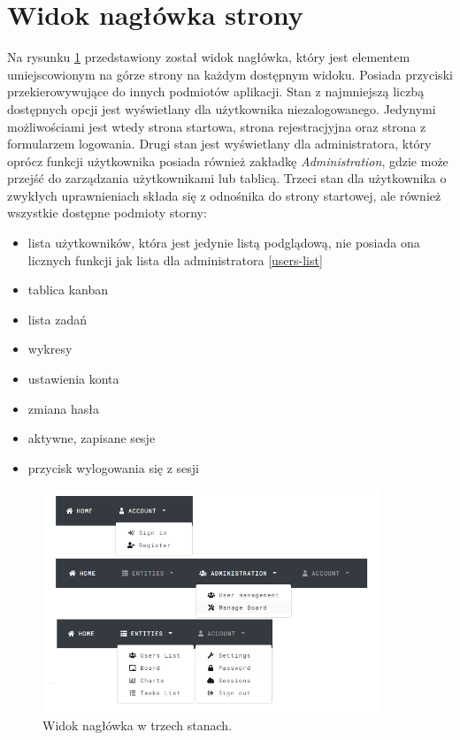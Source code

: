 \section{Widok nagłówka strony}
Na rysunku \ref{navbar-states} przedstawiony został widok nagłówka, który jest elementem umiejscowionym na górze strony na każdym dostępnym widoku. Posiada przyciski przekierowywujące do innych podmiotów aplikacji.
Stan z najmniejszą liczbą dostępnych opcji jest wyświetlany dla użytkownika niezalogowanego. Jedynymi możliwościami jest wtedy strona startowa, strona rejestracjyjna oraz strona z formularzem logowania.
Drugi stan jest wyświetlany dla administratora, który oprócz funkcji użytkownika posiada również zakładkę \linebreak \textit{Administration}, gdzie może przejść do zarządzania użytkownikami lub tablicą.
Trzeci stan dla użytkownika o zwykłych uprawnieniach składa się z odnośnika do strony startowej, ale również wszystkie dostępne podmioty storny: 
\begin{itemize}
	\item lista użytkowników, która jest jedynie listą podglądową, nie posiada ona licznych funkcji jak lista dla administratora \ref{users-list}
	\item tablica kanban
	\item lista zadań
	\item wykresy
	\item ustawienia konta
	\item zmiana hasła
	\item aktywne, zapisane sesje
	\item przycisk wylogowania się z sesji
\end{itemize}
\begin{figure}[h!]
	\centering
	\includegraphics[width=0.90\textwidth]{navbar-states}
	
	\caption{Widok nagłówka w trzech stanach.}
	\label{navbar-states}
\end{figure}
\clearpage

